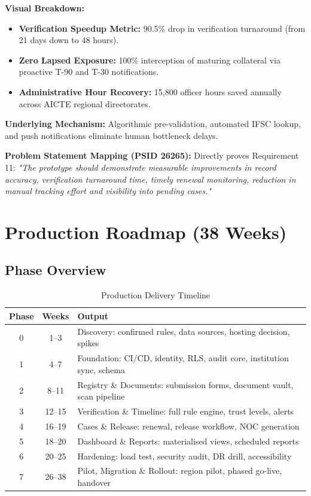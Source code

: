 \documentclass[12pt, a4paper]{report}
\begin{document}
\begin{tcolorbox}[colback=trustL2!5!white, colframe=trustL2, title={Performance Impact: Empirical Benefits of Portal Adoption}]
\textbf{Visual Breakdown:}
\begin{itemize}[leftmargin=1.5em]
  \item \textbf{Verification Speedup Metric:} 90.5\% drop in verification turnaround (from 21 days down to 48 hours).
  \item \textbf{Zero Lapsed Exposure:} 100\% interception of maturing collateral via proactive T-90 and T-30 notifications.
  \item \textbf{Administrative Hour Recovery:} 15,800 officer hours saved annually across AICTE regional directorates.
\end{itemize}

\textbf{Underlying Mechanism:} Algorithmic pre-validation, automated IFSC lookup, and push notifications eliminate human bottleneck delays.

\textbf{Problem Statement Mapping (PSID 26265):} Directly proves Requirement 11: \textit{"The prototype should demonstrate measurable improvements in record accuracy, verification turnaround time, timely renewal monitoring, reduction in manual tracking effort and visibility into pending cases."}
\end{tcolorbox}

\chapter{Production Roadmap (38 Weeks)}

\section{Phase Overview}

\begin{table}[H]
\centering
\caption{Production Delivery Timeline}
\begin{tabularx}{\textwidth}{|c|c|X|}
\hline
\textbf{Phase} & \textbf{Weeks} & \textbf{Output} \\
\hline
0 & 1--3 & Discovery: confirmed rules, data sources, hosting decision, spikes \\
\hline
1 & 4--7 & Foundation: CI/CD, identity, RLS, audit core, institution sync, schema \\
\hline
2 & 8--11 & Registry \& Documents: submission forms, document vault, scan pipeline \\
\hline
3 & 12--15 & Verification \& Timeline: full rule engine, trust levels, alerts \\
\hline
4 & 16--19 & Cases \& Release: renewal, release workflow, NOC generation \\
\hline
5 & 18--20 & Dashboard \& Reports: materialised views, scheduled reports \\
\hline
6 & 20--25 & Hardening: load test, security audit, DR drill, accessibility \\
\hline
7 & 26--38 & Pilot, Migration \& Rollout: region pilot, phased go-live, handover \\
\hline
\end{tabularx}
\end{table}
\end{document}
